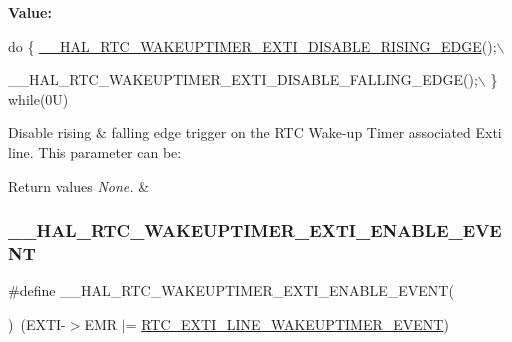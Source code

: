 {\bfseries Value\+:}
\begin{DoxyCode}
\textcolor{keywordflow}{do} \{ \hyperlink{group___r_t_c_ex___wake_up___timer_ga11e7f1f6333edce0c78f4d4f4d496c82}{\_\_HAL\_RTC\_WAKEUPTIMER\_EXTI\_DISABLE\_RISING\_EDGE}();\(\backslash\)
                                                                     
       \_\_HAL\_RTC\_WAKEUPTIMER\_EXTI\_DISABLE\_FALLING\_EDGE();\(\backslash\)
                                                                    \} \textcolor{keywordflow}{while}(0U)
\end{DoxyCode}


Disable rising \& falling edge trigger on the R\+TC Wake-\/up Timer associated Exti line. This parameter can be\+: 


\begin{DoxyRetVals}{Return values}
{\em None.} & \\
\hline
\end{DoxyRetVals}
\mbox{\label{group___r_t_c_ex___wake_up___timer_gadc3d27024b156eb8bda551b479c3d324}} 
\subsubsection{\texorpdfstring{\+\_\+\+\_\+\+H\+A\+L\+\_\+\+R\+T\+C\+\_\+\+W\+A\+K\+E\+U\+P\+T\+I\+M\+E\+R\+\_\+\+E\+X\+T\+I\+\_\+\+E\+N\+A\+B\+L\+E\+\_\+\+E\+V\+E\+NT}{\_\_HAL\_RTC\_WAKEUPTIMER\_EXTI\_ENABLE\_EVENT}}
{\footnotesize\ttfamily \#define \+\_\+\+\_\+\+H\+A\+L\+\_\+\+R\+T\+C\+\_\+\+W\+A\+K\+E\+U\+P\+T\+I\+M\+E\+R\+\_\+\+E\+X\+T\+I\+\_\+\+E\+N\+A\+B\+L\+E\+\_\+\+E\+V\+E\+NT(\begin{DoxyParamCaption}{ }\end{DoxyParamCaption})~(E\+X\+TI-\/$>$E\+MR $\vert$= \hyperlink{group___r_t_c_ex___private___constants_ga1a1a58e244663850786c387bfa5474f2}{R\+T\+C\+\_\+\+E\+X\+T\+I\+\_\+\+L\+I\+N\+E\+\_\+\+W\+A\+K\+E\+U\+P\+T\+I\+M\+E\+R\+\_\+\+E\+V\+E\+NT})}



